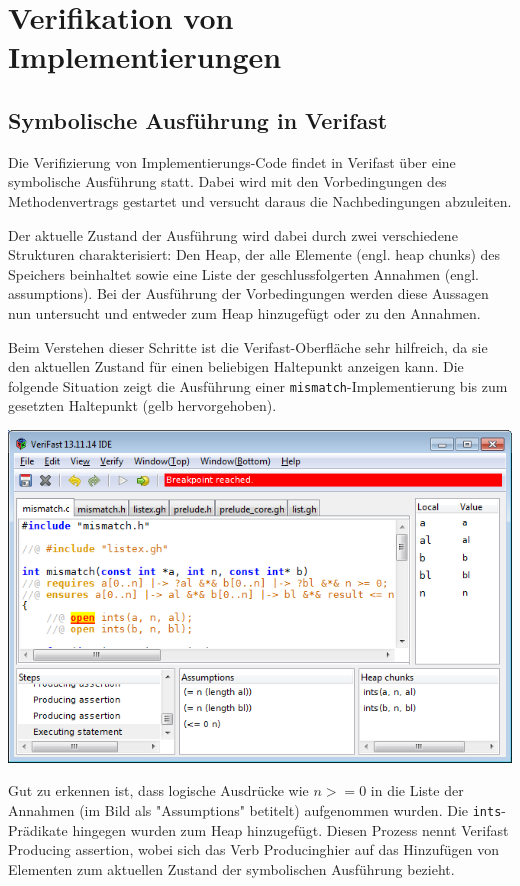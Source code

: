 ﻿\section{Verifikation von Implementierungen}

\subsection{Symbolische Ausführung in Verifast}

Die Verifizierung von Implementierungs-Code findet in Verifast über eine symbolische Ausführung statt.
Dabei wird mit den Vorbedingungen des Methodenvertrags gestartet und versucht daraus die
Nachbedingungen abzuleiten.

Der aktuelle Zustand der Ausführung wird dabei durch zwei verschiedene Strukturen charakterisiert: 
Den Heap, der alle Elemente (engl. heap chunks) des Speichers beinhaltet sowie eine Liste
der geschlussfolgerten Annahmen (engl. assumptions). Bei der Ausführung der Vorbedingungen werden
diese Aussagen nun untersucht und entweder zum Heap hinzugefügt oder zu den Annahmen.

Beim Verstehen dieser Schritte ist die Verifast-Oberfläche sehr hilfreich, da sie den aktuellen
Zustand für einen beliebigen Haltepunkt anzeigen kann. Die folgende Situation zeigt die Ausführung
einer \lstinline{mismatch}-Implementierung bis zum gesetzten Haltepunkt (gelb hervorgehoben).

\begin{center}
\includegraphics[width=1.0\textwidth]{images/verifast-state-after-precondition.png}
\end{center}

Gut zu erkennen ist, dass logische Ausdrücke wie \(n >= 0\) in die Liste der Annahmen 
(im Bild als "Assumptions" betitelt) aufgenommen wurden. Die \lstinline{ints}-Prädikate hingegen
wurden zum Heap hinzugefügt. Diesen Prozess nennt Verifast \glqq Producing assertion\grqq, wobei sich das Verb
\glqq Producing\grqq hier auf das Hinzufügen von Elementen zum aktuellen Zustand der symbolischen Ausführung
bezieht.

